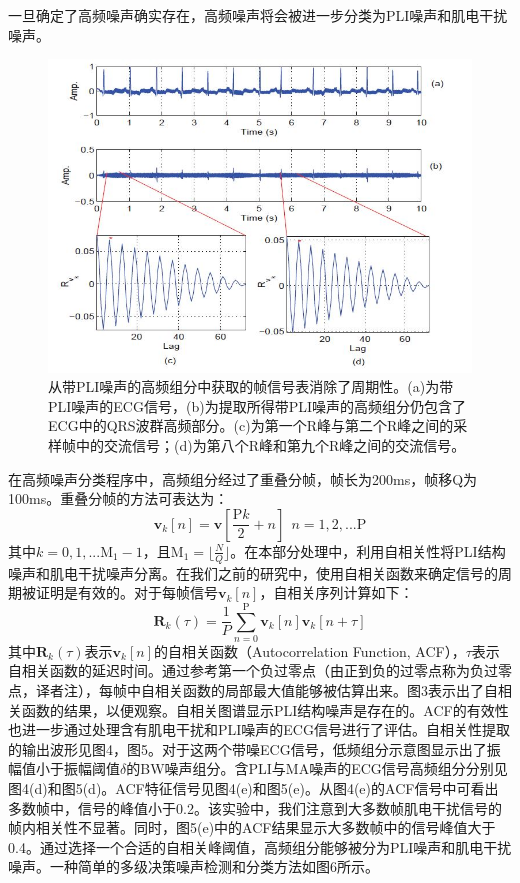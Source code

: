 一旦确定了高频噪声确实存在，高频噪声将会被进一步分类为PLI噪声和肌电干扰噪声。
\begin{figure}%
\label{figNo.3}
\centering
\includegraphics[width=0.5\columnwidth]{fig3.jpg}
\caption{
\wuhao
从带PLI噪声的高频组分中获取的帧信号表消除了周期性。(a)为带PLI噪声的ECG信号，(b)为提取所得带PLI噪声的高频组分仍包含了ECG中的QRS波群高频部分。(c)为第一个R峰与第二个R峰之间的采样帧中的交流信号；(d)为第八个R峰和第九个R峰之间的交流信号。
}
\end{figure}
在高频噪声分类程序中，高频组分经过了重叠分帧，帧长为200ms，帧移Q为100ms。重叠分帧的方法可表达为：
\begin{equation}
  \mathbf{v}_{k}[n]=\mathbf{v}[\frac{\mathrm{P}k}{2}+n]~~n=1,2,...\mathrm{P}
  \label{equ7}
\end{equation}
其中$k=0,1,...\mathrm{M_1}-1$，且$\mathrm{M_1}=\lfloor\frac{N}{Q}\rfloor$。在本部分处理中，利用自相关性将PLI结构噪声和肌电干扰噪声分离。在我们之前的研究中，使用自相关函数来确定信号的周期被证明是有效的。对于每帧信号$\mathbf{v}_{k}[n]$，自相关序列计算如下：
\begin{equation}
  \mathbf{R}_{k}(\tau)=\frac{1}{P}\sum^{\mathrm{P}}_{n=0}\mathbf{v}_{k}[n]\mathbf{v}_{k}[n+\tau]
  \label{equ8}
\end{equation}
其中$\mathbf{R}_{k}(\tau)$表示$\mathbf{v}_{k}[n]$的自相关函数（Autocorrelation Function, ACF），$\tau$表示自相关函数的延迟时间。通过参考第一个负过零点（由正到负的过零点称为负过零点，译者注），每帧中自相关函数的局部最大值能够被估算出来。图3表示出了自相关函数的结果，以便观察。自相关图谱显示PLI结构噪声是存在的。ACF的有效性也进一步通过处理含有肌电干扰和PLI噪声的ECG信号进行了评估。自相关性提取的输出波形见图4，图5。对于这两个带噪ECG信号，低频组分示意图显示出了振幅值小于振幅阈值$\delta$的BW噪声组分。含PLI与MA噪声的ECG信号高频组分分别见图4(d)和图5(d)。ACF特征信号见图4(e)和图5(e)。从图4(e)的ACF信号中可看出多数帧中，信号的峰值小于0.2。该实验中，我们注意到大多数帧肌电干扰信号的帧内相关性不显著。同时，图5(e)中的ACF结果显示大多数帧中的信号峰值大于0.4。通过选择一个合适的自相关峰阈值，高频组分能够被分为PLI噪声和肌电干扰噪声。一种简单的多级决策噪声检测和分类方法如图6所示。 
